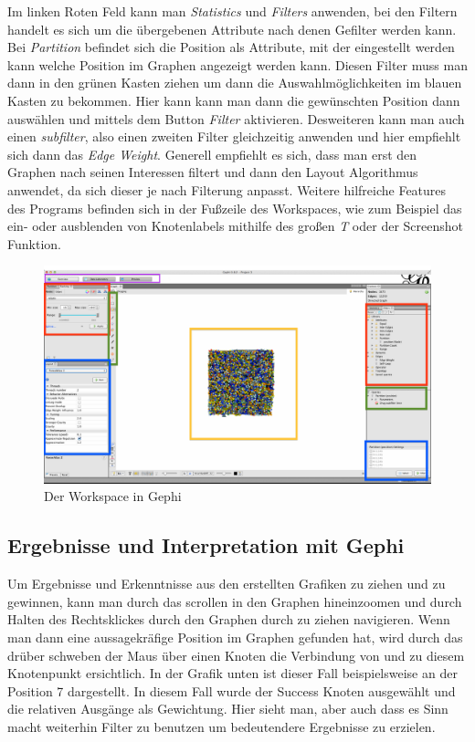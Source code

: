 Im linken Roten Feld kann man \textit{Statistics} und \textit{Filters} anwenden, bei den Filtern handelt es sich um die übergebenen Attribute nach denen Gefilter werden kann. Bei \textit{Partition} befindet sich die Position als Attribute, mit der eingestellt werden kann welche Position im Graphen angezeigt werden kann. Diesen Filter muss man dann in den grünen Kasten ziehen um dann die Auswahlmöglichkeiten im blauen Kasten zu bekommen. Hier kann kann man dann die gewünschten Position dann auswählen und mittels dem Button \textit{Filter} aktivieren. Desweiteren kann man auch einen \textit{subfilter}, also einen zweiten Filter gleichzeitig anwenden und hier empfiehlt sich dann das \textit{Edge Weight}. Generell empfiehlt es sich, dass man erst den Graphen nach seinen Interessen filtert und dann den Layout Algorithmus anwendet, da sich dieser je nach Filterung anpasst. Weitere hilfreiche Features des Programs befinden sich in der Fußzeile des Workspaces, wie zum Beispiel das ein- oder ausblenden von Knotenlabels mithilfe des großen \textit{T} oder der Screenshot Funktion.

\begin{figure}[H]
    \centering
    \includegraphics[scale=0.25]{workspace.png}
    \caption[workspace]{Der Workspace in Gephi}
    \label{workspace}
\end{figure}


\subsection*{Ergebnisse und Interpretation mit Gephi}
Um Ergebnisse und Erkenntnisse aus den erstellten Grafiken zu ziehen und zu gewinnen, kann man durch das scrollen in den Graphen hineinzoomen und durch Halten des Rechtsklickes durch den Graphen durch zu ziehen navigieren. Wenn man dann eine aussagekräfige Position im Graphen gefunden hat, wird durch das drüber schweben der Maus über einen Knoten die Verbindung von und zu diesem Knotenpunkt ersichtlich. In der Grafik unten ist dieser Fall beispielsweise an der Position 7 dargestellt. In diesem Fall wurde der Success Knoten ausgewählt und die relativen Ausgänge als Gewichtung. Hier sieht man, aber auch dass es Sinn macht weiterhin Filter zu benutzen um bedeutendere Ergebnisse zu erzielen.


